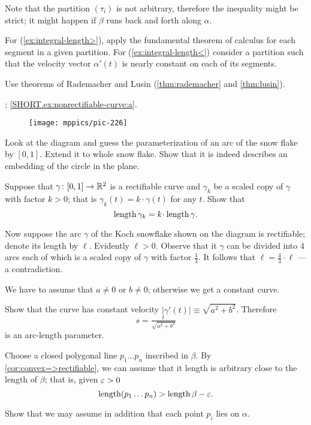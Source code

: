 Note that the partition $(\tau_i)$ is not arbitrary, therefore the inequality might be strict; it might happen if $\beta$ runs back and forth along $\alpha$.




 For (\ref{ex:integral-length>}), apply the fundamental theorem of calculus for each segment in a given partition. For (\ref{ex:integral-length<}) consider a partition such that the velocity vector $\alpha'(t)$ is nearly constant on each of its segments.

 Use theorems of Rademacher and Lusin (\ref{thm:rademacher} and \ref{thm:lusin}).

\parbf{\ref{ex:nonrectifiable-curve}}; \ref{SHORT.ex:nonrectifiable-curve:a}.
\begin{figure}[h!]
\vskip-0mm
\centering
\texttt{[image: mppics/pic-226]}
\vskip0mm
\end{figure}
Look at the diagram and guess the parameterization of an arc of the snow flake by $[0,1]$.
Extend it to whole snow flake.
Show that it is indeed describes an embedding of the circle in the plane.

Suppose that $\gamma\colon[0,1]\to\mathbb{R}^2$ is a rectifiable curve and $\gamma_k$ be a scaled copy of $\gamma$ with factor $k>0$;
that is $\gamma_k(t)=k\cdot\gamma(t)$ for any $t$.
Show that 
\[\length\gamma_k=k\cdot\length \gamma.\]

Now suppose the arc $\gamma$ of the Koch snowflake shown on the diagram is rectifiable; denote its length by $\ell$.
Evidently $\ell>0$.
Observe that it $\gamma$ can be divided into 4 arcs each of which is a scaled copy of $\gamma$ with factor $\tfrac13$.
It follows that $\ell=\tfrac43\cdot\ell$ --- a contradiction.


We have to assume that $a\ne 0$ or $b\ne0$;
otherwise we get a constant curve.

Show that the curve has constant velocity $|\gamma'(t)|\equiv \sqrt{a^2+b^2}$.
Therefore 
\[s=\tfrac{t}{\sqrt{a^2+b^2}}\] is an arc-length parameter.


Choose a closed polygonal line $p_1\dots p_n$ inscribed in $\beta$.
By \ref{cor:convex=>rectifiable}, we can assume that it length is arbitrary close to the length of $\beta$;
that is, given $\varepsilon>0$ 
\[\mathop{\rm length}\nolimits (p_1\dots p_n)>\mathop{\rm length}\nolimits\beta-\varepsilon.\]

Show that we may assume in addition that each point $p_i$ lies on $\alpha$.

